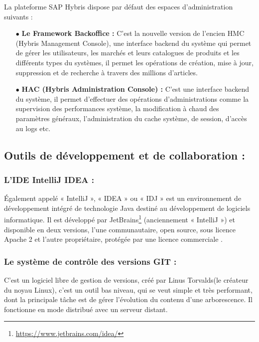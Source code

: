 \medskip

La plateforme SAP Hybris dispose par défaut des espaces d'administration suivants :

\begin{itemize}
\medskip
    \item[$\bullet$] \textbf{Le Framework Backoffice :} C'est la nouvelle version de l'encien HMC (Hybris Management Console), une interface backend du système qui permet de gérer les utilisateurs, les marchés et leurs catalogues de produits et les différents types du systèmes, il permet les opérations de création, mise à jour, suppression et de recherche à travers des millions d’articles\cite{sap}.
    \medskip
    \item[$\bullet$] \textbf{HAC (Hybris Administration Console) :} C’est une interface backend du système, il permet d’effectuer des opérations d’administrations comme la supervision des performances système, la modification à chaud des paramètres généraux, l’administration du cache système, de session, d’accès au logs etc\cite{sap}.
\end{itemize}

\subsection{Outils de développement et de collaboration :}

\subsubsection{L'IDE IntelliJ IDEA :} Également appelé « IntelliJ », « IDEA » ou « IDJ » est un environnement de développement intégré de technologie Java destiné au développement de logiciels informatique. Il est développé par JetBrains\footnote{\url{https://www.jetbrains.com/idea/}} (anciennement « IntelliJ ») et disponible en deux versions, l'une communautaire, open source, sous licence Apache 2 et l'autre propriétaire, protégée par une licence commerciale \cite{wiki:intellij}.

\subsubsection{Le système de contrôle des versions GIT :} C'est un logiciel libre de gestion de versions, créé par Linus Torvalds(le créateur du noyau Linux), c’est un outil bas niveau, qui se veut simple et très performant, dont la principale tâche est de gérer l’évolution du contenu d’une arborescence. Il fonctionne en mode distribué avec un serveur distant\cite{wiki:git}.

